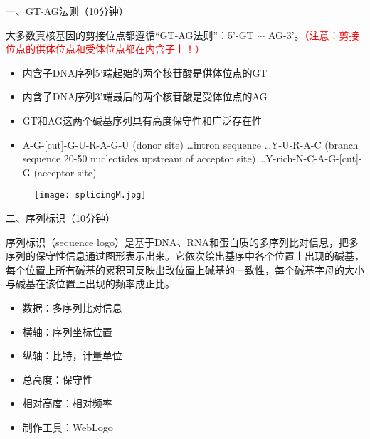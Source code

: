 \documentclass{TIJMUjiaoanSY}
\begin{document}


\firstTail


\newpage
\otherHeader

\noindent
一、GT-AG法则（10分钟）

大多数真核基因的剪接位点都遵循“GT-AG法则”：5'-GT $\cdots$ AG-3'。\textcolor{red}{（注意：剪接位点的供体位点和受体位点都在内含子上！）}
\begin{itemize}
  \item 内含子DNA序列5'端起始的两个核苷酸是供体位点的GT
  \item 内含子DNA序列3'端最后的两个核苷酸是受体位点的AG
  \item GT和AG这两个碱基序列具有高度保守性和广泛存在性
  \item A-G-[cut]-G-U-R-A-G-U (donor site) \ldots intron sequence \ldots Y-U-R-A-C (branch sequence 20-50 nucleotides upstream of acceptor site) \ldots Y-rich-N-C-A-G-[cut]-G (acceptor site)
\end{itemize}

\begin{figure}[ht]
  \centering
  \texttt{[image: splicingM.jpg]}
\end{figure}

\vspace*{0.2cm}
\noindent
二、序列标识（10分钟）

序列标识（sequence logo）是基于DNA、RNA和蛋白质的多序列比对信息，把多序列的保守性信息通过图形表示出来。它依次绘出基序中各个位置上出现的碱基，每个位置上所有碱基的累积可反映出改位置上碱基的一致性，每个碱基字母的大小与碱基在该位置上出现的频率成正比。
\begin{itemize}
  \item 数据：多序列比对信息
  \item 横轴：序列坐标位置
  \item 纵轴：比特，计量单位
  \item 总高度：保守性
  \item 相对高度：相对频率
  \item 制作工具：WebLogo
\end{itemize}
\end{document}
